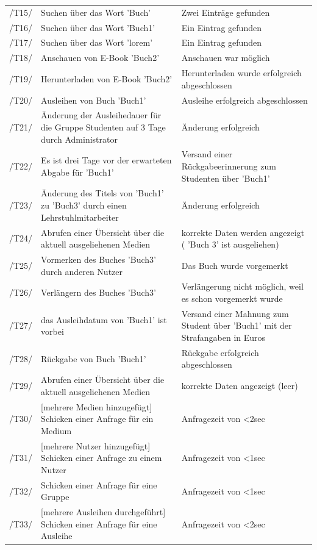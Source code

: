\documentclass[12pt, a4paper]{article}
\begin{document}
\begin{table}
	\begin{tabular}{p{1.2cm}|p{6.5cm}|p{5.5cm}}

		\hline
		/T15/ & Suchen über das Wort  'Buch'  & Zwei Einträge gefunden\\
		/T16/ & Suchen über das Wort  'Buch1'  & Ein Eintrag gefunden\\
		\hline
		/T17/ & Suchen über das Wort  'lorem'  & Ein Eintrag gefunden\\
		\hline
		/T18/ & Anschauen von E-Book  'Buch2'  & Anschauen war möglich\\
		\hline
		/T19/ & Herunterladen von E-Book  'Buch2'  & Herunterladen wurde erfolgreich abgeschlossen\\
		\hline
		/T20/ & Ausleihen von Buch  'Buch1'  & Ausleihe erfolgreich abgeschlossen\\
		\hline
		/T21/ & Änderung der Ausleihedauer für die Gruppe Studenten auf 3 Tage durch Administrator & Änderung erfolgreich\\
		\hline
		/T22/ & Es ist drei Tage vor der erwarteten Abgabe für  'Buch1' & Versand einer Rückgabeerinnerung zum Studenten über 'Buch1' \\
		\hline
		/T23/ & Änderung des Titels von  'Buch1'  zu  'Buch3' durch einen Lehrstuhlmitarbeiter & Änderung erfolgreich\\
		\hline
		/T24/ & Abrufen einer Übersicht über die aktuell ausgeliehenen Medien & korrekte Daten werden angezeigt ( 'Buch 3'  ist ausgeliehen)\\
		\hline
		/T25/ & Vormerken des Buches 'Buch3' durch anderen Nutzer & Das Buch wurde vorgemerkt\\
		\hline
		/T26/ & Verlängern des Buches 'Buch3' & Verlängerung nicht möglich, weil es schon vorgemerkt wurde\\
		\hline
		/T27/ & das Ausleihdatum von  'Buch1'  ist vorbei & Versand einer Mahnung zum Student über  'Buch1'  mit der Strafangaben in Euros \\
		\hline
		/T28/ & Rückgabe von Buch  'Buch1'  & Rückgabe erfolgreich abgeschlossen\\
		\hline
		/T29/ & Abrufen einer Übersicht über die aktuell ausgeliehenen Medien & korrekte Daten angezeigt (leer)\\
		\hline
		/T30/ & [mehrere Medien hinzugefügt] Schicken einer Anfrage für ein Medium & Anfragezeit von \textless 2sec\\
		\hline
		/T31/ & [mehrere Nutzer hinzugefügt] Schicken einer Anfrage zu einem Nutzer & Anfragezeit von \textless 1sec\\
		\hline
		/T32/ & Schicken einer Anfrage für eine Gruppe & Anfragezeit von \textless 1sec\\
		\hline
		/T33/ & [mehrere Ausleihen durchgeführt] Schicken einer Anfrage für eine Ausleihe & Anfragezeit von \textless 2sec\\
    \end{tabular}
\end{table}
\pagebreak
\end{document}
